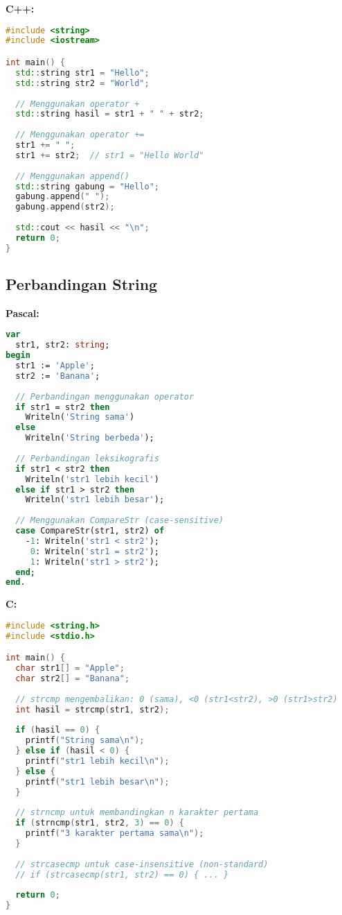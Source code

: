 \documentclass[../main.tex]{subfiles}
\begin{document}
\textbf{C++:}
\begin{lstlisting}[language=C++, caption={Konkatenasi di C++}]
#include <string>
#include <iostream>

int main() {
  std::string str1 = "Hello";
  std::string str2 = "World";
  
  // Menggunakan operator +
  std::string hasil = str1 + " " + str2;
  
  // Menggunakan operator +=
  str1 += " ";
  str1 += str2;  // str1 = "Hello World"
  
  // Menggunakan append()
  std::string gabung = "Hello";
  gabung.append(" ");
  gabung.append(str2);
  
  std::cout << hasil << "\n";
  return 0;
}
\end{lstlisting}

\subsection{Perbandingan String}

\textbf{Pascal:}
\begin{lstlisting}[language=Pascal, caption={Perbandingan di Pascal}]
var
  str1, str2: string;
begin
  str1 := 'Apple';
  str2 := 'Banana';
  
  // Perbandingan menggunakan operator
  if str1 = str2 then
    Writeln('String sama')
  else
    Writeln('String berbeda');
  
  // Perbandingan leksikografis
  if str1 < str2 then
    Writeln('str1 lebih kecil')
  else if str1 > str2 then
    Writeln('str1 lebih besar');
  
  // Menggunakan CompareStr (case-sensitive)
  case CompareStr(str1, str2) of
    -1: Writeln('str1 < str2');
     0: Writeln('str1 = str2');
     1: Writeln('str1 > str2');
  end;
end.
\end{lstlisting}

\textbf{C:}
\begin{lstlisting}[language=C, caption={Perbandingan di C}]
#include <string.h>
#include <stdio.h>

int main() {
  char str1[] = "Apple";
  char str2[] = "Banana";
  
  // strcmp mengembalikan: 0 (sama), <0 (str1<str2), >0 (str1>str2)
  int hasil = strcmp(str1, str2);
  
  if (hasil == 0) {
    printf("String sama\n");
  } else if (hasil < 0) {
    printf("str1 lebih kecil\n");
  } else {
    printf("str1 lebih besar\n");
  }
  
  // strncmp untuk membandingkan n karakter pertama
  if (strncmp(str1, str2, 3) == 0) {
    printf("3 karakter pertama sama\n");
  }
  
  // strcasecmp untuk case-insensitive (non-standard)
  // if (strcasecmp(str1, str2) == 0) { ... }
  
  return 0;
}
\end{lstlisting}
\end{document}
